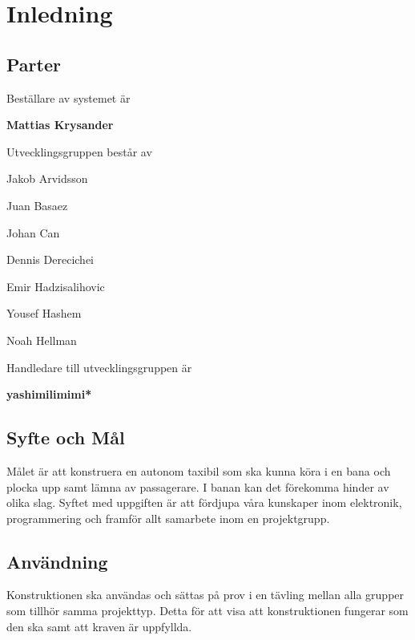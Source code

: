\documentclass[kravspec/krav.tex]{subfiles}
\begin{document}
\section{Inledning}


\subsection{Parter}
Beställare av systemet är
\begin{list}{}
    \item \bfseries Mattias Krysander      
\end{list}
\vspace{4mm}
\noindent
Utvecklingsgruppen består av
{\bfseries
\begin{list}{}
   \item Jakob Arvidsson
   \item Juan Basaez
   \item Johan Can
   \item Dennis Derecichei
   \item Emir Hadzisalihovic 
   \item Yousef Hashem
   \item Noah Hellman
\end{list}
}
\vspace{4mm}

\noindent
Handledare till utvecklingsgruppen är
\begin{list}{}	
	\item \bfseries *yashimilimimi*
\end{list}
\vspace{4mm}

\subsection{Syfte och Mål}
Målet är att konstruera en autonom taxibil som ska kunna köra i en bana och
plocka upp samt lämna av passagerare. I banan kan det förekomma hinder av olika
slag. Syftet med uppgiften är att fördjupa våra kunskaper inom elektronik,
programmering och framför allt samarbete inom en projektgrupp.

\subsection{Användning}
Konstruktionen ska användas och sättas på prov i en tävling mellan alla grupper som tillhör samma projekttyp. Detta för att visa att konstruktionen fungerar som den ska samt att kraven är uppfyllda.
\end{document}
